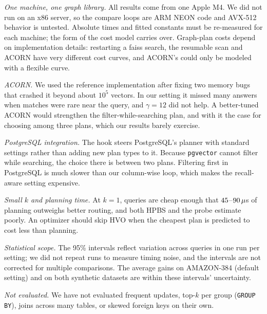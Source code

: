 \documentclass[sigconf,nonacm]{acmart}
\begin{document}
\emph{One machine, one graph library.} All results come from one Apple M4. We did not run on an x86 server, so the compare loops are ARM NEON code and AVX-512 behavior is untested. Absolute times and fitted constants must be re-measured for each machine; the form of the cost model carries over. Graph-plan costs depend on implementation details: restarting a faiss search, the resumable scan and ACORN have very different cost curves, and ACORN's could only be modeled with a flexible curve.

\emph{ACORN.} We used the reference implementation after fixing two memory bugs that crashed it beyond about $10^5$ vectors. In our setting it missed many answers when matches were rare near the query, and $\gamma=12$ did not help. A better-tuned ACORN would strengthen the filter-while-searching plan, and with it the case for choosing among three plans, which our results barely exercise.

\emph{PostgreSQL integration.} The hook steers PostgreSQL's planner with standard settings rather than adding new plan types to it. Because \texttt{pgvector} cannot filter while searching, the choice there is between two plans. Filtering first in PostgreSQL is much slower than our column-wise loop, which makes the recall-aware setting expensive.

\emph{Small $k$ and planning time.} At $k=1$, queries are cheap enough that $45$--$90\,\mu$s of planning outweighs better routing, and both HPBS and the probe estimate poorly. An optimizer should skip HVO when the cheapest plan is predicted to cost less than planning.

\emph{Statistical scope.} The 95\% intervals reflect variation across queries in one run per setting; we did not repeat runs to measure timing noise, and the intervals are not corrected for multiple comparisons. The average gains on AMAZON-384 (default setting) and on both synthetic datasets are within these intervals' uncertainty.

\emph{Not evaluated.} We have not evaluated frequent updates, top-$k$ per group (\texttt{GROUP BY}), joins across many tables, or skewed foreign keys on their own.
\end{document}
